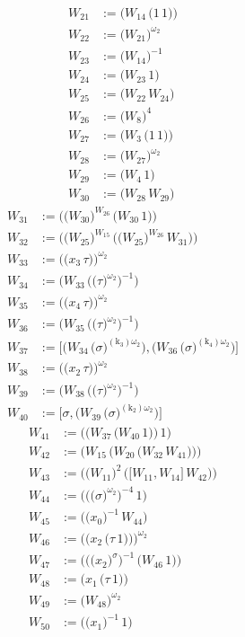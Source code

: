 \begin{align*}
W_{21} &:= \bigl(W_{14}\,\bigl(1\,1\bigr)\bigr) \\
W_{22} &:= \bigl(W_{21}\bigr)^{\omega_2} \\
W_{23} &:= \bigl(W_{14}\bigr)^{-1} \\
W_{24} &:= \bigl(W_{23}\,1\bigr) \\
W_{25} &:= \bigl(W_{22}\,W_{24}\bigr) \\
W_{26} &:= \bigl(W_{8}\bigr)^{4} \\
W_{27} &:= \bigl(W_{3}\,\bigl(1\,1\bigr)\bigr) \\
W_{28} &:= \bigl(W_{27}\bigr)^{\omega_2} \\
W_{29} &:= \bigl(W_{4}\,1\bigr) \\
W_{30} &:= \bigl(W_{28}\,W_{29}\bigr)
\end{align*}
\begin{align*}
W_{31} &:= \bigl(\bigl(W_{30}\bigr)^{W_{26}}\,\bigl(W_{30}\,1\bigr)\bigr) \\
W_{32} &:= \bigl(\bigl(W_{25}\bigr)^{W_{15}}\,\bigl(\bigl(W_{25}\bigr)^{W_{26}}\,W_{31}\bigr)\bigr) \\
W_{33} &:= \bigl(\bigl(x_{3}\,\tau\bigr)\bigr)^{\omega_2} \\
W_{34} &:= \bigl(W_{33}\,\bigl(\bigl(\tau\bigr)^{\omega_2}\bigr)^{-1}\bigr) \\
W_{35} &:= \bigl(\bigl(x_{4}\,\tau\bigr)\bigr)^{\omega_2} \\
W_{36} &:= \bigl(W_{35}\,\bigl(\bigl(\tau\bigr)^{\omega_2}\bigr)^{-1}\bigr) \\
W_{37} &:= \bigl[\bigl(W_{34}\,\bigl(\sigma\bigr)^{(\mathrm{k}_{3})\omega_2}\bigr),\bigl(W_{36}\,\bigl(\sigma\bigr)^{(\mathrm{k}_{4})\omega_2}\bigr)\bigr] \\
W_{38} &:= \bigl(\bigl(x_{2}\,\tau\bigr)\bigr)^{\omega_2} \\
W_{39} &:= \bigl(W_{38}\,\bigl(\bigl(\tau\bigr)^{\omega_2}\bigr)^{-1}\bigr) \\
W_{40} &:= \bigl[\sigma,\bigl(W_{39}\,\bigl(\sigma\bigr)^{(\mathrm{k}_{2})\omega_2}\bigr)\bigr]
\end{align*}
\begin{align*}
W_{41} &:= \bigl(\bigl(W_{37}\,\bigl(W_{40}\,1\bigr)\bigr)\,1\bigr) \\
W_{42} &:= \bigl(W_{15}\,\bigl(W_{20}\,\bigl(W_{32}\,W_{41}\bigr)\bigr)\bigr) \\
W_{43} &:= \bigl(\bigl(W_{11}\bigr)^{2}\,\bigl(\bigl[W_{11},W_{14}\bigr]\,W_{42}\bigr)\bigr) \\
W_{44} &:= \bigl(\bigl(\bigl(\sigma\bigr)^{\omega_2}\bigr)^{-4}\,1\bigr) \\
W_{45} &:= \bigl(\bigl(x_{0}\bigr)^{-1}\,W_{44}\bigr) \\
W_{46} &:= \bigl(\bigl(x_{2}\,\bigl(\tau\,1\bigr)\bigr)\bigr)^{\omega_2} \\
W_{47} &:= \bigl(\bigl(\bigl(x_{2}\bigr)^{\sigma}\bigr)^{-1}\,\bigl(W_{46}\,1\bigr)\bigr) \\
W_{48} &:= \bigl(x_{1}\,\bigl(\tau\,1\bigr)\bigr) \\
W_{49} &:= \bigl(W_{48}\bigr)^{\omega_2} \\
W_{50} &:= \bigl(\bigl(x_{1}\bigr)^{-1}\,1\bigr)
\end{align*}
